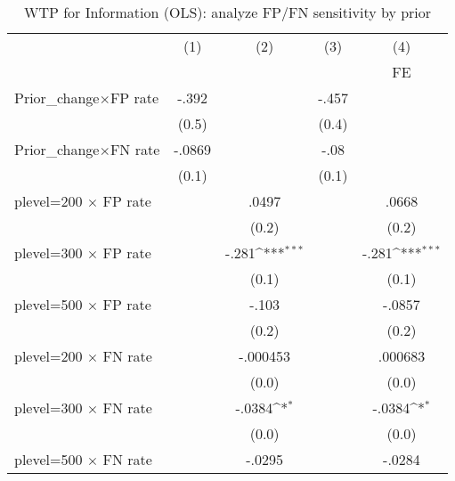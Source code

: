 \begin{table}[htbp]\centering
\def\sym#1{\ifmmode^{#1}\else\(^{#1}\)\fi}
\caption{WTP for Information (OLS): analyze FP/FN sensitivity by prior}
\begin{tabular}{l*{4}{c}}
\hline\hline
                &\multicolumn{1}{c}{(1)}&\multicolumn{1}{c}{(2)}&\multicolumn{1}{c}{(3)}&\multicolumn{1}{c}{(4)}\\
                &\multicolumn{1}{c}{}&\multicolumn{1}{c}{}&\multicolumn{1}{c}{}&\multicolumn{1}{c}{FE}\\
\hline
Prior\_change$\times$FP rate&    -.392         &                  &    -.457         &                  \\
                &    (0.5)         &                  &    (0.4)         &                  \\
Prior\_change$\times$FN rate&   -.0869         &                  &     -.08         &                  \\
                &    (0.1)         &                  &    (0.1)         &                  \\
plevel=200 $\times$ FP rate&                  &    .0497         &                  &    .0668         \\
                &                  &    (0.2)         &                  &    (0.2)         \\
plevel=300 $\times$ FP rate&                  &    -.281\sym{***}&                  &    -.281\sym{***}\\
                &                  &    (0.1)         &                  &    (0.1)         \\
plevel=500 $\times$ FP rate&                  &    -.103         &                  &   -.0857         \\
                &                  &    (0.2)         &                  &    (0.2)         \\
plevel=200 $\times$ FN rate&                  & -.000453         &                  &  .000683         \\
                &                  &    (0.0)         &                  &    (0.0)         \\
plevel=300 $\times$ FN rate&                  &   -.0384\sym{*}  &                  &   -.0384\sym{*}  \\
                &                  &    (0.0)         &                  &    (0.0)         \\
plevel=500 $\times$ FN rate&                  &   -.0295         &                  &   -.0284         \\

\end{tabular}
\end{table}
